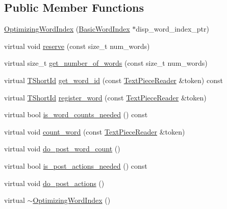 \subsection*{Public Member Functions}
\begin{DoxyCompactItemize}
\item 
\hyperlink{classuva_1_1smt_1_1tries_1_1dictionary_1_1_optimizing_word_index_a9c7f3e6299e77be4ce163c288bbd2c20}{Optimizing\+Word\+Index} (\hyperlink{classuva_1_1smt_1_1tries_1_1dictionary_1_1_basic_word_index}{Basic\+Word\+Index} $\ast$disp\+\_\+word\+\_\+index\+\_\+ptr)
\item 
virtual void \hyperlink{classuva_1_1smt_1_1tries_1_1dictionary_1_1_optimizing_word_index_a7381da7d8e7bedf2fdf1d88076a43cb2}{reserve} (const size\+\_\+t num\+\_\+words)
\item 
virtual size\+\_\+t \hyperlink{classuva_1_1smt_1_1tries_1_1dictionary_1_1_optimizing_word_index_a0f2e75f30cbe04d9e74538c54a515c59}{get\+\_\+number\+\_\+of\+\_\+words} (const size\+\_\+t num\+\_\+words)
\item 
virtual \hyperlink{namespaceuva_1_1smt_1_1hashing_adcf22e1982ad09d3a63494c006267469}{T\+Short\+Id} \hyperlink{classuva_1_1smt_1_1tries_1_1dictionary_1_1_optimizing_word_index_a157981a189cca43eed35aaf640c1aa67}{get\+\_\+word\+\_\+id} (const \hyperlink{classuva_1_1smt_1_1file_1_1_text_piece_reader}{Text\+Piece\+Reader} \&token) const 
\item 
virtual \hyperlink{namespaceuva_1_1smt_1_1hashing_adcf22e1982ad09d3a63494c006267469}{T\+Short\+Id} \hyperlink{classuva_1_1smt_1_1tries_1_1dictionary_1_1_optimizing_word_index_ad23968ee31767ce6ae8a8ed85772532e}{register\+\_\+word} (const \hyperlink{classuva_1_1smt_1_1file_1_1_text_piece_reader}{Text\+Piece\+Reader} \&token)
\item 
virtual bool \hyperlink{classuva_1_1smt_1_1tries_1_1dictionary_1_1_optimizing_word_index_af749f27894b0b3f288311a5149c4e9f6}{is\+\_\+word\+\_\+counts\+\_\+needed} () const 
\item 
virtual void \hyperlink{classuva_1_1smt_1_1tries_1_1dictionary_1_1_optimizing_word_index_a7a640c40e5e3591f7c547fc096f5fbf0}{count\+\_\+word} (const \hyperlink{classuva_1_1smt_1_1file_1_1_text_piece_reader}{Text\+Piece\+Reader} \&token)
\item 
virtual void \hyperlink{classuva_1_1smt_1_1tries_1_1dictionary_1_1_optimizing_word_index_a006bedc2159e545d6436a3bdb7a6a5c5}{do\+\_\+post\+\_\+word\+\_\+count} ()
\item 
virtual bool \hyperlink{classuva_1_1smt_1_1tries_1_1dictionary_1_1_optimizing_word_index_a96f673f041e96ab38843c63a984f6ce5}{is\+\_\+post\+\_\+actions\+\_\+needed} () const 
\item 
virtual void \hyperlink{classuva_1_1smt_1_1tries_1_1dictionary_1_1_optimizing_word_index_afbc88af75c91c7c366467bdc07dbc978}{do\+\_\+post\+\_\+actions} ()
\item 
virtual \hyperlink{classuva_1_1smt_1_1tries_1_1dictionary_1_1_optimizing_word_index_a018a78505a045e56c641f213975ba8e0}{$\sim$\+Optimizing\+Word\+Index} ()
\end{DoxyCompactItemize}
